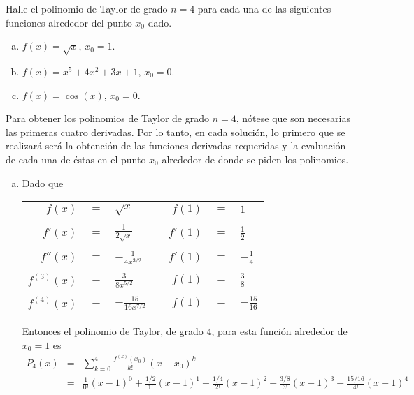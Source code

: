 \begin{enunciado}
 Halle el polinomio de Taylor de grado $n=4$ para cada una de las siguientes funciones alrededor del punto $x_0$ dado.
 \begin{enumerate}[(a)]
  \item $f(x) = \sqrt{x}$, $x_0 = 1$.
  \item $f(x) = x^5 + 4x^2 + 3x + 1$, $x_0 = 0$.
  \item $f(x) = \cos(x)$, $x_0 = 0$.
 \end{enumerate}
\end{enunciado}

\begin{solucion}
 Para obtener los polinomios de Taylor de grado $n=4$, n\'otese que son necesarias las primeras cuatro derivadas. Por lo tanto, en cada soluci\'on, lo primero que se realizar\'a ser\'a la obtenci\'on de las funciones derivadas requeridas y la evaluaci\'on de cada una de \'estas en el punto $x_0$ alrededor de donde se piden los polinomios.
 \begin{enumerate}[(a)]
  \item Dado que
  \begin{center}
   \begin{tabular}{rclcrcl}
    $f(x)$ & $=$ & $\sqrt{x}$ & \hspace{2cm} & $f(1)$ & $=$ & $1$ \\
    \\
    $f'(x)$ & $=$ & $\displaystyle{ \frac{1}{2\sqrt{x}} }$ & & $f'(1)$ & $=$ & $\displaystyle{ \frac{1}{2} }$ \\
    \\
    $f''(x)$ & $=$ & $\displaystyle{ -\frac{1}{4x^{3/2}} }$ & & $f'(1)$ & $=$ & $\displaystyle{ - \frac{1}{4} }$ \\
    \\
    $f^{(3)}(x)$ & $=$ & $\displaystyle{ \frac{3}{8x^{5/2}} }$ & & $f(1)$ & $=$ & $\displaystyle{ \frac{3}{8} }$ \\
    \\
    $f^{(4)}(x)$ & $=$ & $\displaystyle{ -\frac{15}{16x^{7/2}} }$ & & $f(1)$ & $=$ & $\displaystyle{ - \frac{15}{16} }$
   \end{tabular}
  \end{center}
  Entonces el polinomio de Taylor, de grado $4$, para esta funci\'on alrededor de $x_0 = 1$ es
  \begin{eqnarray*}
   P_4(x) & = & \sum_{k=0}^{4} \frac{f^{(k)}(x_0)}{k!} (x-x_0)^k \\
   & = & \frac{1}{0!} (x-1)^{0} + \frac{1/2}{1!} (x-1)^{1} - \frac{1/4}{2!} (x-1)^{2} + \frac{3/8}{3!} (x-1)^{3} - \frac{15/16}{4!} (x-1)^{4} \\

\end{eqnarray*}
\end{enumerate}
\end{solucion}
